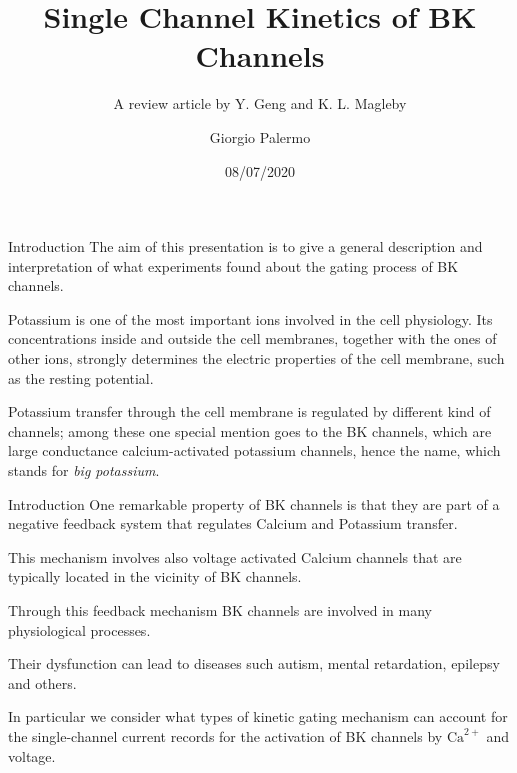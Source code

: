 \documentclass[t]{beamer}
\title{Single Channel Kinetics of BK Channels}
\subtitle{A review article by Y. Geng and K. L. Magleby}
\author{Giorgio Palermo}
\date{08/07/2020}
\institute{LM Physics - a.a. 2019/20 - Biological Physics }
\newcommand{\ca}{\text{Ca}^{2+}}
\begin{document}
\begin{frame}{}
  \titlepage
\end{frame}




\begin{frame}{Introduction}
The aim of this presentation is to give a general description and interpretation of what experiments found about the gating process of BK channels.

Potassium is one of the most important ions involved in the cell physiology.
Its concentrations inside and outside the cell membranes, together with the ones of other ions, strongly determines the electric properties of the cell membrane, such as the resting potential. 

Potassium transfer through the cell membrane is regulated by different kind of channels; among these one special mention goes to the BK channels, which are large conductance calcium-activated potassium channels, hence the name, which stands for \emph{big potassium}.

\end{frame}

\begin{frame}{Introduction}
One remarkable property of BK channels is that they are part of a negative feedback system that regulates Calcium and Potassium transfer.

This mechanism involves also voltage activated Calcium channels that are typically located in the vicinity of BK channels.


Through this feedback mechanism BK channels are involved in many physiological processes.

Their dysfunction can lead to diseases such autism, mental retardation, epilepsy and others.

In particular we consider what types of kinetic gating mechanism can account for the single-channel current records for the activation of BK channels by $\ca$ and voltage.
\end{frame}
\end{document}
